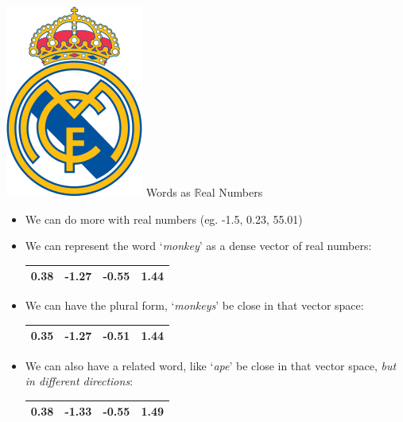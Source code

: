 \documentclass[xcolor=pdftex,x11names,table,hyperref]{beamer}
\begin{document}
\begin{frame}{\includegraphics[width=0.06\textheight]{images/real_madrid_cf.png} \hspace{1.5em} Words as $\mathbb{R}$eal Numbers}
\begin{itemize}
	\item We can do more with real numbers (eg. -1.5, 0.23, 55.01)
	\pause
	\item We can represent the word `\textit{monkey}' as a dense vector of real numbers: \\[0.4em]
		\begin{tabular}{|c|c|c|c|}
		    \hline
			0.38 & -1.27 & -0.55 & 1.44 \\
		    \hline
		\end{tabular}
	\pause
	\item We can have the plural form, `\textit{monkeys}' be close in that vector space: \\[0.4em]
		\begin{tabular}{|c|c|c|c|}
		    \hline
			\bf 0.35 & -1.27 & \bf -0.51 & 1.44 \\
		    \hline
		\end{tabular}
	\pause
	\item We can also have a related word, like `\textit{ape}' be close in that vector space, \emph{but in different directions}: \\[0.4em]
		\begin{tabular}{|c|c|c|c|}
		    \hline
			0.38 & \bf -1.33 & -0.55 & \bf 1.49 \\
		    \hline
		\end{tabular}
\end{itemize}
\end{frame}
\end{document}
